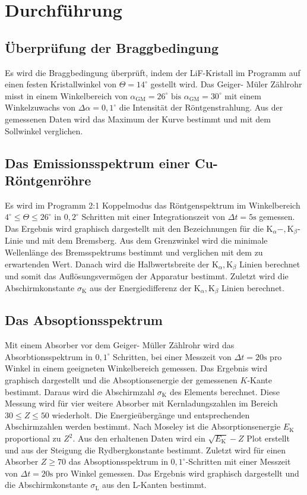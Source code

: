 \section{Durchführung}
\label{sec:Durchführung}
\subsection{Überprüfung der Braggbedingung}
Es wird die Braggbedingung überprüft, indem der LiF-Kristall im Programm auf einen festen Kristallwinkel von $\Theta = 14^\circ$ gestellt wird.
Das Geiger- Müler Zählrohr misst in einem Winkelbereich von ${\alpha}_{\text{GM}} = 26^\circ \text{ bis } {\alpha}_{\text{GM}} = 30^\circ$ mit einem Winkelzuwachs von $\Delta \alpha = 0,1^\circ$ die Intensität der Röntgenstrahlung.
Aus der gemessenen Daten wird das Maximum der Kurve bestimmt und mit dem Sollwinkel verglichen.

\subsection{Das Emissionsspektrum einer Cu-Röntgenröhre}
Es wird im Programm 2:1 Koppelmodus das Röntgenspektrum im Winkelbereich $4^\circ \leq \Theta \leq 26^\circ$ in $0,2^\circ$ Schritten mit einer Integrationszeit von $\Delta t = 5 \text{s}$ gemessen.
Das Ergebnis wird graphisch dargestellt mit den Bezeichnungen für die $\text{K}_{\alpha}-,\text{K}_{\beta}$-Linie und mit dem Bremsberg.
Aus dem Grenzwinkel wird die minimale Wellenlänge des Bremsspektrums bestimmt und verglichen mit dem zu erwartenden Wert.
Danach wird die Halbwertsbreite der $\text{K}_{\alpha},\text{K}_{\beta}$ Linien berechnet und somit das Auflösungsvermögen der Apparatur bestimmt.
Zuletzt wird die Abschirmkonstante ${\sigma}_\text{K}$ aus der Energiedifferenz der $\text{K}_{\alpha},\text{K}_{\beta}$ Linien berechnet.

\subsection{Das Absoptionsspektrum}
Mit einem Absorber vor dem Geiger- Müller Zählrohr wird das Absorbtionsspektrum in $0,1^\circ$ Schritten, bei einer Messzeit von $\Delta t = 20 \text{s}$ pro Winkel in einem geeigneten Winkelbereich gemessen.
Das Ergebnis wird graphisch dargestellt und die Absoptionsenergie der gemessenen $K$-Kante bestimmt.
Daraus wird die Abschirmzahl ${\sigma}_{\text{K}}$ des Elements berechnet.
Diese Messung wird für vier weitere Absorber mit Kernladungszahlen im Bereich $30 \leq Z \leq 50$ wiederholt.
Die Energieübergänge und entsprechenden Abschirmzahlen werden bestimmt.
Nach Moseley ist die Absorptionsenergie $E_{\text{K}}$ proportional zu $Z^2$.
Aus den erhaltenen Daten wird ein $\sqrt{E_{\text{K}}} - Z$ Plot erstellt und aus der Steigung die Rydbergkonstante bestimmt.
Zuletzt wird für einen Absorber $Z \geq 70 $ das Absoptionsspektrum in $0,1^\circ$-Schritten mit einer Messzeit von $\Delta t = 20 \text{s}$ pro Winkel gemessen.
Das Ergebnis wird graphisch dargestellt und die Abschirmkonstante ${\sigma}_{\text{L}}$ aus den L-Kanten bestimmt.
